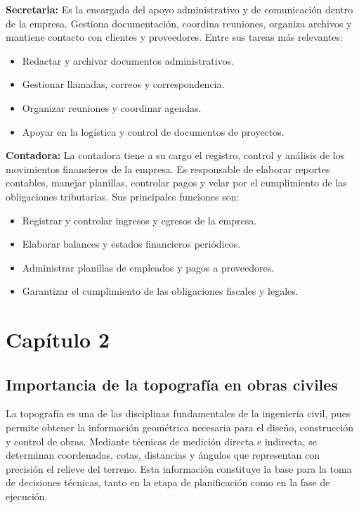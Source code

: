 \documentclass[12pt]{article}
\let\oldsection\section
\renewcommand{\section}{\clearpage\oldsection}
\begin{document}
	\textbf{Secretaria:}  
	Es la encargada del apoyo administrativo y de comunicación dentro de la empresa. Gestiona documentación, coordina reuniones, organiza archivos y mantiene contacto con clientes y proveedores.  
	Entre sus tareas más relevantes:
	\begin{itemize}
		\item Redactar y archivar documentos administrativos.
		\item Gestionar llamadas, correos y correspondencia.
		\item Organizar reuniones y coordinar agendas.
		\item Apoyar en la logística y control de documentos de proyectos.
	\end{itemize}
	
	\textbf{Contadora:}  
	La contadora tiene a su cargo el registro, control y análisis de los movimientos financieros de la empresa. Es responsable de elaborar reportes contables, manejar planillas, controlar pagos y velar por el cumplimiento de las obligaciones tributarias.  
	Sus principales funciones son:
	\begin{itemize}
		\item Registrar y controlar ingresos y egresos de la empresa.
		\item Elaborar balances y estados financieros periódicos.
		\item Administrar planillas de empleados y pagos a proveedores.
		\item Garantizar el cumplimiento de las obligaciones fiscales y legales.
	\end{itemize}
	
	
	
	\section{Capítulo 2}


	
	\subsection{Importancia de la topografía en obras civiles}
	
	La topografía es una de las disciplinas fundamentales de la ingeniería civil, pues permite obtener la información geométrica necesaria para el diseño, construcción y control de obras.  
	Mediante técnicas de medición directa e indirecta, se determinan coordenadas, cotas, distancias y ángulos que representan con precisión el relieve del terreno.  
	Esta información constituye la base para la toma de decisiones técnicas, tanto en la etapa de planificación como en la fase de ejecución.
	
\end{document}
